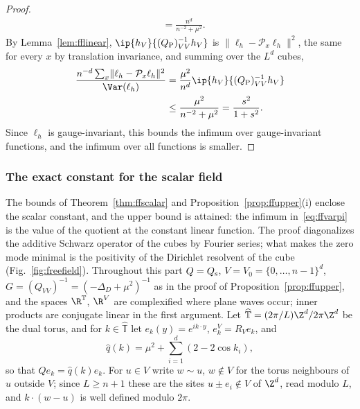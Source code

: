 \begin{proof}
\begin{align*}
&=\frac{n^d}{n^{-2}+\mu^2}.
\end{align*}
By Lemma~\ref{lem:fflinear}, $\ip{h_V}{(Q_{\rm P})_{VV}^{-1}h_V}$ is
$\lVert\ell_h-\mathcal P_x\ell_h\rVert^2$, the same for every $x$ by
translation invariance, and summing over the $L^d$ cubes,
\begin{align*}
\frac{n^{-d}\sum_x\lVert\ell_h-\mathcal P_x\ell_h\rVert^2}{\Var(\ell_h)}&=
\frac{\mu^2}{n^d}\ip{h_V}{(Q_{\rm P})_{VV}^{-1}h_V}\\
&\le\frac{\mu^2}{n^{-2}+\mu^2}=\frac{s^2}{1+s^2}.
\end{align*}
 Since $\ell_h$
is gauge-invariant, this bounds the infimum over gauge-invariant functions,
and the infimum over all functions is smaller.
\end{proof}

\subsubsection{The exact constant for the scalar field}

The bounds of Theorem~\ref{thm:ffscalar} and Proposition~\ref{prop:ffupper}(i)
enclose the scalar constant, and the upper bound is attained: the infimum
in~\eqref{eq:ffvarpi} is the value of the quotient at the constant linear
function. The proof diagonalizes the additive Schwarz operator of the cubes by
Fourier series; what makes the zero mode minimal is the positivity of the
Dirichlet resolvent of the cube (Fig.~\ref{fig:freefield}). Throughout this part $Q=Q_{\rm s}$, $V=V_0=
\{0,\dots,n-1\}^d$, $G=(Q_{VV})^{-1}=(-\Delta_D+\mu^2)^{-1}$ as in the proof
of Proposition~\ref{prop:ffupper}, and the spaces $\R^{\mathbb T}$, $\R^V$ are
complexified where plane waves occur; inner products are conjugate linear in
the first argument. Let $\widehat{\mathbb T}=(2\pi/L)\Z^d/2\pi\Z^d$ be the
dual torus, and for $k\in\widehat{\mathbb T}$ let $e_k(y)=e^{ik\cdot y}$,
$e_k^V=R_Ve_k$, and
\[
\hat q(k)=\mu^2+\sum_{i=1}^d(2-2\cos k_i),
\]
so that $Qe_k=\hat q(k)e_k$. For $u\in V$ write $w\sim u$, $w\notin V$ for the
torus neighbours of $u$ outside $V$; since $L\ge n+1$ these are the sites
$u\pm e_i\notin V$ of $\Z^d$, read modulo $L$, and $k\cdot(w-u)$ is well
defined modulo $2\pi$.

